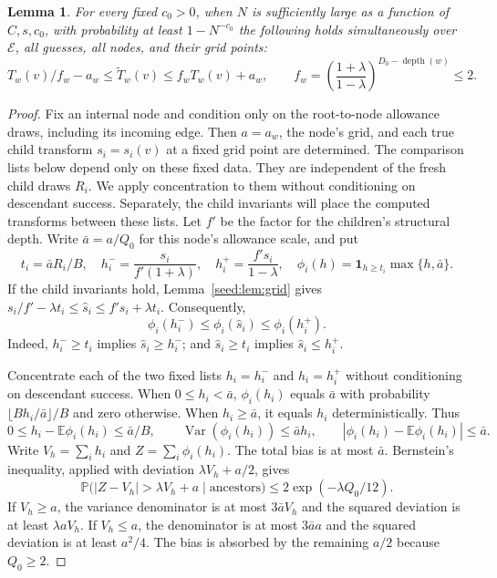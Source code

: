 \documentclass[11pt]{article}
\newtheorem{lemma}[theorem]{Lemma}
\theoremstyle{definition}
\newcommand{\E}{\mathbb E}
\newcommand{\Prb}{\mathbb P}
\newcommand{\1}{\mathbf 1}
\begin{document}
\begin{lemma}\label{seed:lem:concentration}
For every fixed $c_0>0$, when $N$ is sufficiently large as a function
of $C,s,c_0$, with probability at least $1-N^{-c_0}$ the following holds
simultaneously over $\mathcal E$, all guesses, all nodes, and their grid
points:
\[
 T_w(v)/f_w-a_w\le\widetilde T_w(v)\le f_wT_w(v)+a_w,
 \qquad
 f_w=\left(\frac{1+\lambda}{1-\lambda}\right)^{D_0-\operatorname{depth}(w)}
 \le2.
\]
\end{lemma}
\begin{proof}
Fix an internal node and condition only on the root-to-node allowance
draws, including its incoming edge.
Then $a=a_w$, the node's grid, and each true child transform
$s_i=s_i(v)$ at a fixed grid point are determined.
The comparison lists below depend only on these fixed data.
They are independent of the fresh child draws $R_i$.
We apply concentration to them without conditioning on descendant
success. Separately, the child invariants will place the computed
transforms between these lists.
Let $f'$ be the factor for the children's structural depth.
Write $\bar a=a/Q_0$ for this node's allowance scale, and put
\[
 t_i=\bar aR_i/B,\quad
 h_i^- =\frac{s_i}{f'(1+\lambda)},\quad
 h_i^+=\frac{f's_i}{1-\lambda},\quad
 \phi_i(h)=\1_{h\ge t_i}\max\{h,\bar a\}.
\]
If the child invariants hold, Lemma~\ref{seed:lem:grid} gives
$s_i/f'-\lambda t_i\le\widehat s_i\le f's_i+\lambda t_i$.
Consequently,
\[
 \phi_i(h_i^-)\le\phi_i(\widehat s_i)\le\phi_i(h_i^+).
\]
Indeed, $h_i^-\ge t_i$ implies $\widehat s_i\ge h_i^-$; and
$\widehat s_i\ge t_i$ implies $\widehat s_i\le h_i^+$.

Concentrate each of the two fixed lists $h_i=h_i^-$ and $h_i=h_i^+$
without conditioning on descendant success. When $0\le h_i<\bar a$,
$\phi_i(h_i)$ equals $\bar a$ with probability
$\lfloor Bh_i/\bar a\rfloor/B$ and zero otherwise. When $h_i\ge \bar a$, it equals
$h_i$ deterministically. Thus
\[
 0\le h_i-\E\phi_i(h_i)\le \bar a/B,\qquad
 \operatorname{Var}(\phi_i(h_i))\le \bar a h_i,\qquad
 |\phi_i(h_i)-\E\phi_i(h_i)|\le \bar a.
\]
Write $V_h=\sum_i h_i$ and $Z=\sum_i\phi_i(h_i)$. The total bias is at most
$\bar a$. Bernstein's inequality, applied with deviation
$\lambda V_h+a/2$, gives
\[
 \Prb\bigl(|Z-V_h|>\lambda V_h+a\mid\text{ancestors}\bigr)
 \le 2\exp(-\lambda Q_0/12).
\]
If $V_h\ge a$, the variance denominator is at most $3\bar a V_h$ and the
squared deviation is at least $\lambda aV_h$.
If $V_h\le a$, the denominator is at most $3\bar a a$ and the squared
deviation is at least $a^2/4$. The bias is absorbed by the remaining $a/2$ because $Q_0\ge2$.


\end{proof}
\end{document}
